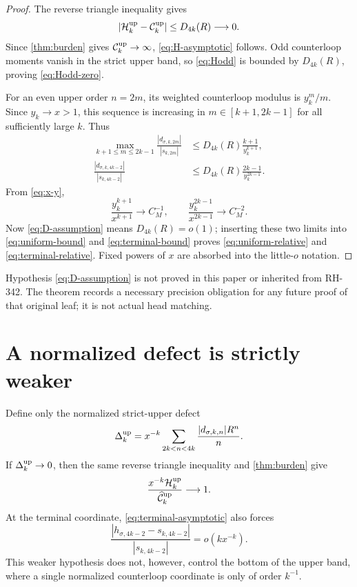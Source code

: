 \documentclass[11pt]{article}
\theoremstyle{remark}
\begin{document}
\begin{proof}
The reverse triangle inequality gives
\begin{equation}\label{eq:budget-difference}
 |\mathcal H_k^{\rm up}-\mathcal C_k^{\rm up}|
 \le D_{4k}(R)\longrightarrow0.
\end{equation}
Since \cref{thm:burden} gives $\mathcal C_k^{\rm up}\to\infty$,
\eqref{eq:H-asymptotic} follows.  Odd counterloop moments vanish in the
strict upper band, so \eqref{eq:Hodd} is bounded by $D_{4k}(R)$, proving
\eqref{eq:Hodd-zero}.

For an even upper order $n=2m$, its weighted counterloop modulus is
$y_k^m/m$.  Since $y_k\to x>1$, this sequence is increasing in
$m\in[k+1,2k-1]$ for all sufficiently large $k$.  Thus
\begin{align}
 \max_{k+1\le m\le2k-1}
 \frac{|d_{\sigma,k,2m}|}{|s_{k,2m}|}
 &\le D_{4k}(R)\frac{k+1}{y_k^{k+1}},
 \label{eq:uniform-bound}\\
 \frac{|d_{\sigma,k,4k-2}|}{|s_{k,4k-2}|}
 &\le D_{4k}(R)\frac{2k-1}{y_k^{2k-1}}.
 \label{eq:terminal-bound}
\end{align}
From \eqref{eq:x-y},
\[
 \frac{y_k^{k+1}}{x^{k+1}}\to C_M^{-1},
 \qquad
 \frac{y_k^{2k-1}}{x^{2k-1}}\to C_M^{-2}.
\]
Now \eqref{eq:D-assumption} means $D_{4k}(R)=o(1)$; inserting these two
limits into \eqref{eq:uniform-bound} and \eqref{eq:terminal-bound} proves
\eqref{eq:uniform-relative} and \eqref{eq:terminal-relative}.  Fixed powers
of $x$ are absorbed into the little-$o$ notation.
\end{proof}

Hypothesis \eqref{eq:D-assumption} is not proved in this paper or inherited
from RH-342.  The theorem records a necessary precision obligation for any
future proof of that original leaf; it is not actual head matching.

\section{A normalized defect is strictly weaker}

Define only the normalized strict-upper defect
\begin{equation}\label{eq:Delta}
 \Delta_k^{\rm up}
 =x^{-k}\sum_{2k<n<4k}
 \frac{|d_{\sigma,k,n}|R^n}{n}.
\end{equation}
If $\Delta_k^{\rm up}\to0$, then the same reverse triangle inequality and
\cref{thm:burden} give
\begin{equation}\label{eq:weak-aggregate}
 \frac{x^{-k}\mathcal H_k^{\rm up}}
 {\widehat{\mathcal C}_k^{\rm up}}\longrightarrow1.
\end{equation}
At the terminal coordinate, \eqref{eq:terminal-asymptotic} also forces
\begin{equation}\label{eq:weak-terminal}
 \frac{|h_{\sigma,4k-2}-s_{k,4k-2}|}
 {|s_{k,4k-2}|}=o(kx^{-k}).
\end{equation}
This weaker hypothesis does not, however, control the bottom of the upper
band, where a single normalized counterloop coordinate is only of order
$k^{-1}$.
\end{document}
